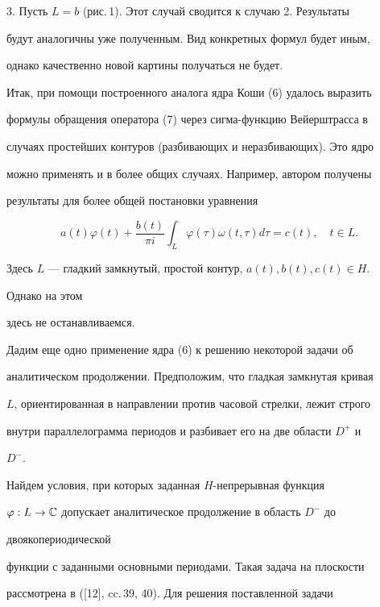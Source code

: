 \medskip 


 


3. Пусть $L=b$ (рис.\,1). Этот случай сводится к случаю 2. Результаты 


будут аналогичны уже полученным. Вид конкретных формул будет иным, 


однако качественно новой картины получаться не будет. 


 


Итак, при помощи построенного аналога ядра Коши (6) удалось выразить 


формулы обращения оператора (7) через сигма-функцию Вейерштрасса в 


случаях простейших контуров (разбивающих и неразбивающих). Это ядро 


можно применять и в более общих случаях. Например, автором получены 


результаты для более общей постановки уравнения 


$$ 


a(t)\varphi(t)+\frac{b(t)}{\pi i}\int_L \varphi(\tau) 


\omega(t,\tau)d\tau=c(t),\quad t\in L. 


$$ 


Здесь $L$ --- гладкий замкнутый, простой контур, $a(t),b(t),c(t)\in H$. 


Однако на этом 


здесь не останавливаемся. 


 


Дадим еще одно применение ядра (6) к решению некоторой задачи об 


аналитическом продолжении. Предположим, что гладкая замкнутая кривая 


$L$, ориентированная в направлении против часовой стрелки, лежит строго 


внутри параллелограмма периодов и разбивает его на две области $D^+$ и 


$D^-$. 


Найдем условия, при которых заданная $H$-непрерывная функция 


$\varphi:L\to\Bbb C$ допускает аналитическое продолжение в область $D^-$ до 


двоякопериодической 


функции с заданными основными периодами. Такая задача на плоскости 


рассмотрена в ([12], cc.\,39, 40). Для решения поставленной задачи 


